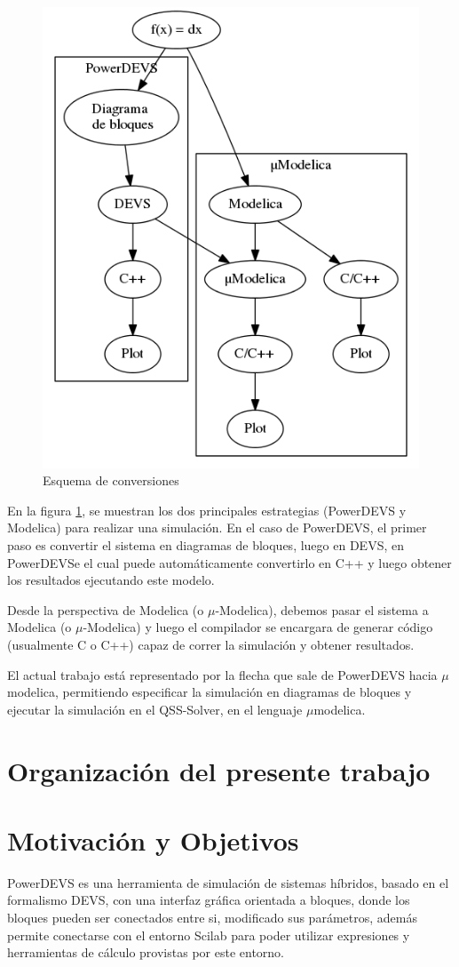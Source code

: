 \begin{figure}[H]
\centering
 \includegraphics[width=0.75\linewidth]{esquema}
 \caption{Esquema de conversiones}
 \label{fig:esquema}
\end{figure}

En la figura \ref{fig:esquema}, se muestran los dos principales estrategias (PowerDEVS y Modelica) para realizar una simulación. En el caso de PowerDEVS, el primer paso es convertir el sistema en diagramas de bloques, luego en DEVS, en PowerDEVSe el cual puede automáticamente convertirlo en C++ y luego obtener los resultados ejecutando este modelo. 

Desde la perspectiva de Modelica (o $\mu$-Modelica), debemos pasar el sistema a Modelica (o $\mu$-Modelica) y luego el compilador se encargara de generar código (usualmente C o C++) capaz de correr la simulación y obtener resultados.

El actual trabajo está representado por la flecha que sale de PowerDEVS hacia $\mu$modelica, permitiendo especificar la simulación en diagramas de bloques y ejecutar la simulación en el QSS-Solver, en el lenguaje $\mu$modelica.

\section{Organización del presente trabajo}

\section{Motivación y Objetivos}
PowerDEVS\cite{BK11} es una herramienta de simulación de sistemas híbridos, basado en el formalismo DEVS\cite{Zeigler:2000:TMS:580780}, con una interfaz gráfica orientada a bloques, donde los bloques pueden ser conectados entre si, modificado sus parámetros, además permite conectarse con el entorno Scilab para poder utilizar expresiones y herramientas de cálculo provistas por este entorno.

